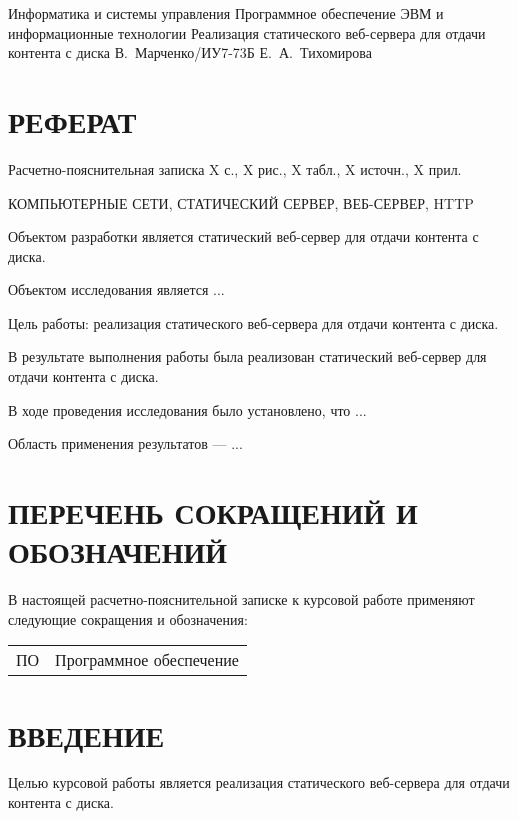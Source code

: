 \documentclass{bmstu}
\begin{document}
\makecourseworktitle
    {Информатика и системы управления}
    {Программное обеспечение ЭВМ и информационные технологии}
    {Реализация статического веб-сервера для отдачи контента с диска}
    {В.~Марченко/ИУ7-73Б}
    {Е.~А.~Тихомирова}
    {}
    
\setcounter{page}{3}

{\centering \chapter*{РЕФЕРАТ}}

Расчетно-пояснительная записка X с., X рис., X табл., X источн., X прил.

\noindent КОМПЬЮТЕРНЫЕ СЕТИ, СТАТИЧЕСКИЙ СЕРВЕР, ВЕБ-СЕРВЕР, HTTP

Объектом разработки является статический веб-сервер для отдачи контента с диска.

Объектом исследования является ...

Цель работы: реализация статического веб-сервера для отдачи контента с диска.

В результате выполнения работы была реализован статический веб-сервер для отдачи контента с диска.

В ходе проведения исследования было установлено, что ...

Область применения результатов --- ...

{\centering \maketableofcontents}

{\centering \chapter*{ПЕРЕЧЕНЬ СОКРАЩЕНИЙ И ОБОЗНАЧЕНИЙ}}

В настоящей расчетно-пояснительной записке к курсовой работе применяют следующие сокращения и обозначения:

\begin{table}[H]
\begin{tabular}{p{5cm}p{10.5cm}}
ПО & Программное обеспечение
\tabularnewline
\end{tabular}
\end{table}

{\centering \chapter*{ВВЕДЕНИЕ}}

Целью курсовой работы является реализация статического веб-сервера для отдачи контента с диска.
\end{document}
